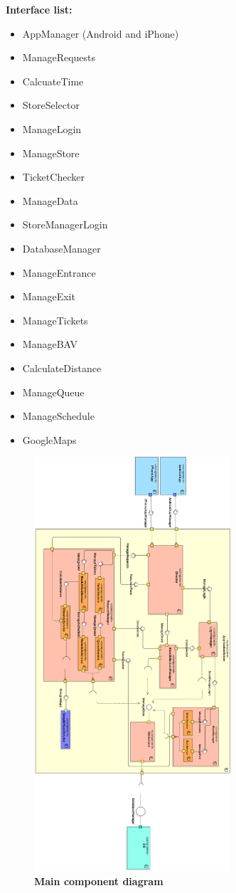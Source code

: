 \textbf{Interface list:}
\begin{itemize}
\item AppManager (Android and iPhone) 
\item ManageRequests 
\item CalcuateTime 
\item StoreSelector 
\item ManageLogin 
\item ManageStore 
\item TicketChecker 
\item ManageData 
\item StoreManagerLogin 
\item DatabaseManager 
\item ManageEntrance 
\item ManageExit 
\item ManageTickets 
\item ManageBAV 
\item CalculateDistance 
\item ManageQueue 
\item ManageSchedule 
\item GoogleMaps 
\end{itemize}

\newpage
\begin{figure}[!h]
\centering
\includegraphics[width=0.65\textwidth]{Images/ComponentDiagram1v3Vert}
\caption{\label{fig:componentdiagram1}\textbf{Main component diagram}}
\end{figure}

